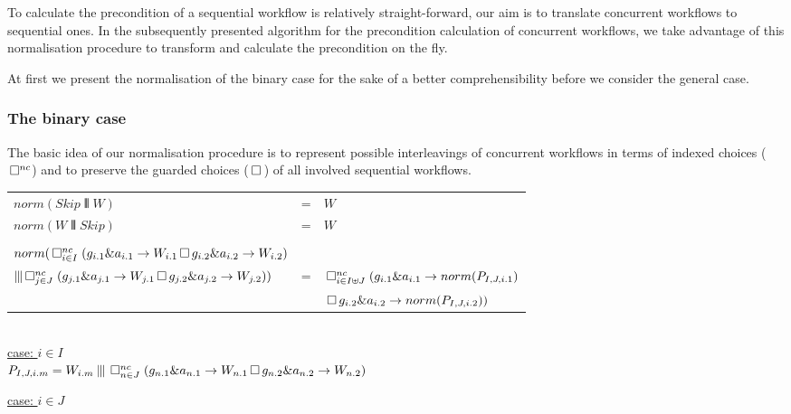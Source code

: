 \documentclass[11pt]{article}
\begin{document}
To calculate the precondition of a sequential workflow is relatively straight-forward, our aim is to translate concurrent workflows to sequential ones. In the subsequently presented algorithm for the precondition calculation of concurrent workflows, we take advantage of this normalisation procedure to transform and calculate the precondition on the fly.

At first we present the normalisation of the binary case for the sake of a better comprehensibility before we consider the general case.

\subsubsection{The binary case}

The basic idea of our normalisation procedure is to represent possible interleavings of concurrent workflows in terms of indexed choices ($\, \Box^{nc}$) and to preserve the guarded choices ($\, \Box \,$) of all involved sequential workflows.

\begin{tabular}{l c l}
	$norm(Skip \interleave W)$ &=& $W$ \\
	$norm(W \interleave Skip)$ &=& $W$ \\
	\\
	$norm(\, \Box^{nc}_{i \in I} \; (g_{i.1} \& a_{i.1} \rightarrow W_{i.1} 
          \, \Box \, g_{i.2} \& a_{i.2} \rightarrow W_{i.2})$ \\
\hspace*{15pt} $\interleave \, \Box^{nc}_{j \in J} \; (g_{j.1} \& a_{j.1} \rightarrow W_{j.1} 
                                                \, \Box \, g_{j.2} \& a_{j.2} \rightarrow W_{j.2}))$ &=& $\, \Box^{nc}_{i \in I \uplus J} \; (g_{i.1} \& a_{i.1} \rightarrow norm(P_{I,J,{i.1}}) $ \\
                      && \qquad \; $\, \Box \, g_{i.2} \& a_{i.2} \rightarrow norm(P_{I,J,{i.2}})) $    
\end{tabular} 
\\[5pt]

\underline{case: $i \in I$} \\

\noindent
$P_{I,J,i.m} = W_{i.m} \interleave \, \Box^{nc}_{n \in J} \; (g_{n.1} \& a_{n.1} \rightarrow W_{n.1} \, \Box \, g_{n.2} \& a_{n.2} \rightarrow W_{n.2})$                                          

\vspace*{1cm}
    
\underline{case: $i \in J$} \\
                                  
\end{document}
